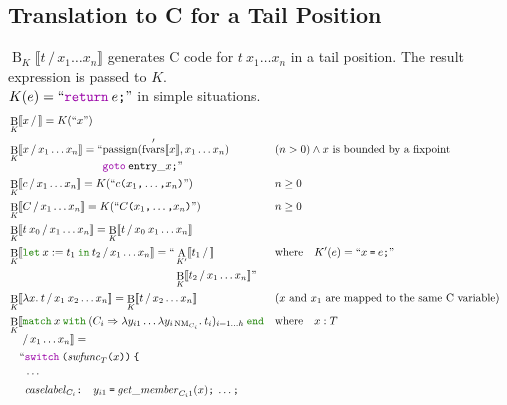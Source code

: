 \documentclass[a4paper,fleqn]{article}
\newcommand{\kwlet}{\mbox{\color{mygreen}\ttfamily let}}
\newcommand{\kwin}{\mbox{\color{mygreen}\ttfamily in}}
\newcommand{\kwmatch}{\mbox{\color{mygreen}\ttfamily match}}
\newcommand{\kwwith}{\mbox{\color{mygreen}\ttfamily with}}
\newcommand{\kwend}{\mbox{\color{mygreen}\ttfamily end}}
\newcommand{\lam}[2]{\lambda #1.\:#2}
\newcommand{\lamB}[1]{\lambda #1.\:}
\newcommand{\letin}[3]{\kwlet\:#1:=#2\:\kwin\:#3}
\newcommand{\match}[4]{\kwmatch\:#1\:\kwwith\:(#2 \Rightarrow #3)_{#4}\:\kwend}
\DeclareMathOperator{\NM}{NM} %
\newcommand{\BRA}[1]{\llbracket #1 \rrbracket}
\newcommand{\ldq}{\text{``}}
\newcommand{\rdq}{\text{''}}
\newcommand{\dq}[1]{\text{``}#1\text{''}}
\newcommand{\ttparen}[1]{\texttt{(}#1\texttt{)}}
\newcommand{\ttlbrace}{\texttt{\char '173}}
\newcommand{\tteq}{\texttt{=}}
\newcommand{\ttsemi}{\texttt{;}}
\newcommand{\ttcomma}{\texttt{,}}
\newcommand{\ttcolon}{\texttt{:}}
\newcommand{\kwswitch}{\mbox{\color{myviolet}\ttfamily switch}}
\newcommand{\kwgoto}{\mbox{\color{myviolet}\ttfamily goto}}
\newcommand{\kwCreturn}{\mbox{\color{myviolet}\ttfamily return}}
\DeclareMathOperator{\passign}{passign}
\DeclareMathOperator{\fvarsop}{fvars}
\newcommand{\fvarsd}[1]{\fvarsop'\BRA{#1}}
\DeclareMathOperator{\Aop}{A}
\DeclareMathOperator{\Bop}{B}
\newcommand{\A}[3]{\Aop_{#1}\BRA{#2\,/\,#3}}
\newcommand{\B}[3]{\Bop_{#1}\BRA{#2\,/\,#3}}
\newcommand{\BbreakEq}[3]{\Bop_{#1}\llbracket \begin{aligned}[t] & #2 \\ & /\, #3 \rrbracket = \end{aligned}}
\begin{document}
\subsection{Translation to C for a Tail Position}\label{sec:BK}
$\B{K}{t}{x_1\ldots x_n}$ generates C code for $t\:x_1\ldots x_n$ in a tail position.
The result expression is passed to $K$. \\
$K(e) = \dq{\kwCreturn\:e\ttsemi}$ in simple situations.
\begin{align*}
  &\B{K}{x}{} = K(\dq{x}) \\
  &\B{K}{x}{x_1\ldots x_n} = \begin{aligned}[t] \ldq & {\passign(\fvarsd{x}, x_1\ldots x_n)} \\ & \kwgoto\:\mathtt{entry\_}x\ttsemi \rdq \end{aligned}
    && (n > 0) \wedge \text{$x$ is bounded by a fixpoint} \\
  &\B{K}{c}{x_1\ldots x_n} = K(\dq{c\ttparen{x_1\ttcomma\dotsc\ttcomma x_n}})                                   && n \geq 0 \\
  &\B{K}{C}{x_1\ldots x_n} = K(\dq{C\ttparen{x_1\ttcomma\dotsc\ttcomma x_n}})                                   && n \geq 0 \\
  &\B{K}{t\:x_0}{x_1\ldots x_n} = \B{K}{t}{x_0\:x_1\ldots x_n} \\
  &\B{K}{\letin{x}{t_1}{t_2}}{x_1\ldots x_n} =
      \begin{aligned}[t] \ldq & \A{K'}{t_1}{} \\ & \B{K}{t_2}{x_1\ldots x_n} \rdq \end{aligned}
    && \text{where}\quad K'(e) = \dq{x\:\tteq\:e\ttsemi} \\
  &\B{K}{\lam{x}{t}}{x_1\:x_2\ldots x_n} = \B{K}{t}{x_2\ldots x_n}                                 && \text{($x$ and $x_1$ are mapped to the same C variable)} \\
  &\BbreakEq{K}{\match{x}{C_i}{\lambda y_{i1}\ldots\lamB{y_{i\NM_{C_i}}}t_i}{i=1\ldots h}}{x_1\ldots x_n} && \text{where}\quad x : T \\
     & \quad\begin{alignedat}{2}
       \ldq & \kwswitch\:\ttparen{\mathit{swfunc}_T\ttparen{x}}\:\ttlbrace \\
            & \cdots \\
            & \mathit{caselabel}_{C_i}\ttcolon\quad
              \begin{aligned}[t]
                & y_{i1}\:\tteq\:\mathit{get\_member}_{C_i1}(x)\ttsemi \:\ldots\ttsemi \\

\end{aligned}
\end{alignedat}
\end{align*}
\end{document}
